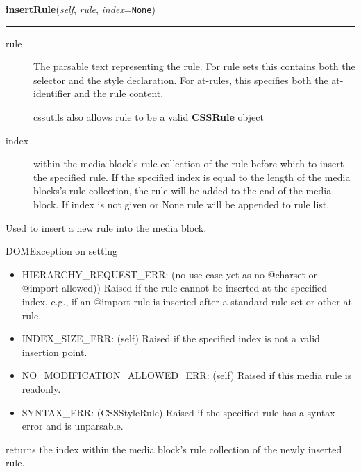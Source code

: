 \hspace{.8\funcindent}\begin{boxedminipage}{\funcwidth}

    \raggedright \textbf{insertRule}(\textit{self}, \textit{rule}, \textit{index}={\tt None})

    \vspace{-1.5ex}

    \rule{\textwidth}{0.5\fboxrule}
\setlength{\parskip}{2ex}
\begin{description}
\item[{rule}] \leavevmode 
The parsable text representing the rule. For rule sets this
contains both the selector and the style declaration. For
at-rules, this specifies both the at-identifier and the rule
content.

cssutils also allows rule to be a valid \textbf{CSSRule} object

\item[{index}] \leavevmode 
within the media block's rule collection of the rule before
which to insert the specified rule. If the specified index is
equal to the length of the media blocks's rule collection, the
rule will be added to the end of the media block.
If index is not given or None rule will be appended to rule
list.

\end{description}

Used to insert a new rule into the media block.

DOMException on setting
\begin{itemize}
\item {} 
HIERARCHY{\_}REQUEST{\_}ERR:
(no use case yet as no @charset or @import allowed))
Raised if the rule cannot be inserted at the specified index,
e.g., if an @import rule is inserted after a standard rule set
or other at-rule.

\item {} 
INDEX{\_}SIZE{\_}ERR: (self)
Raised if the specified index is not a valid insertion point.

\item {} 
NO{\_}MODIFICATION{\_}ALLOWED{\_}ERR: (self)
Raised if this media rule is readonly.

\item {} 
SYNTAX{\_}ERR: (CSSStyleRule)
Raised if the specified rule has a syntax error and is
unparsable.

\end{itemize}

returns the index within the media block's rule collection of the
newly inserted rule.
\setlength{\parskip}{1ex}
    \end{boxedminipage}

